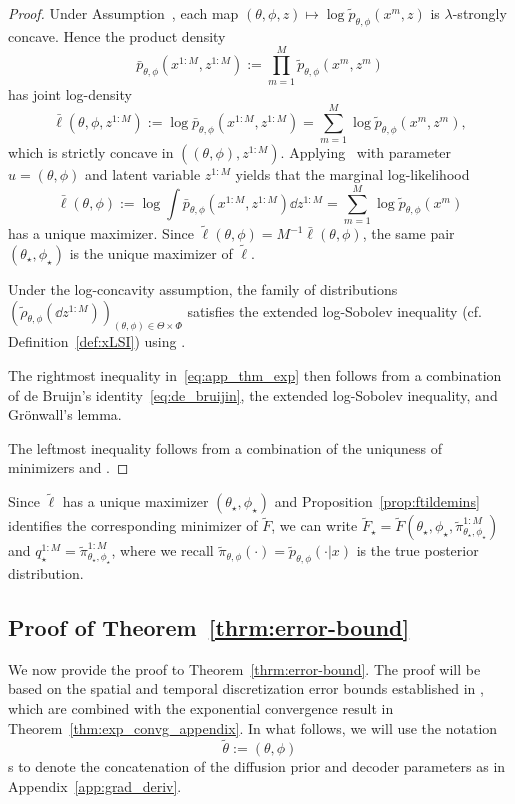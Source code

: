 \begin{proof}

Under Assumption~, each map $(\theta,\phi,z)\mapsto \log \tilde{p}_{\theta,\phi}(x^m,z)$ is $\lambda$-strongly concave. Hence the product density
$$\bar{p}_{\theta,\phi}(x^{1:M},z^{1:M}):=\prod_{m=1}^M\tilde{p}_{\theta,\phi}(x^m,z^m)$$
has joint log-density
$$\bar{\ell}(\theta,\phi,z^{1:M}):=\log \bar{p}_{\theta,\phi}(x^{1:M},z^{1:M})=\sum_{m=1}^M\log\tilde{p}_{\theta,\phi}(x^m,z^m),$$
which is strictly concave in $((\theta,\phi),z^{1:M})$. Applying~\citet[Theorem 4]{kuntz23a} with parameter $u=(\theta,\phi)$ and latent variable $z^{1:M}$ yields that the marginal log-likelihood
$$\bar{\ell}(\theta,\phi):=\log \int \bar{p}_{\theta,\phi}(x^{1:M},z^{1:M}) \dd z^{1:M}=\sum_{m=1}^M\log\tilde{p}_{\theta,\phi}(x^m)$$
has a unique maximizer. Since $\tilde{\ell}(\theta,\phi)=M^{-1}\bar{\ell}(\theta,\phi)$, the same pair $(\theta_\star,\phi_\star)$ is the unique maximizer of $\tilde{\ell}$.

Under the log-concavity assumption, the family of distributions $(\tilde{\rho}_{\theta,\phi}(\dd z^{1:M}))_{(\theta,\phi)\in\Theta\times\Phi}$ satisfies the extended log-Sobolev inequality (cf. Definition~\ref{def:xLSI}) using .

The rightmost inequality in~\eqref{eq:app_thm_exp} then follows from a combination of de Bruijn's identity~\eqref{eq:de_bruijin}, the extended log-Sobolev inequality, and Gr\"onwall's lemma. 

The leftmost inequality follows from a combination of the uniquness of minimizers and . 
\end{proof}
\begin{remark}\label{remark:star_notation}
    Since $\tilde{\ell}$ has a unique maximizer $(\theta_\star,\phi_\star)$ and Proposition~\ref{prop:ftildemins} identifies the corresponding minimizer of $\tilde{F}$, we can write $\tilde{F}_\star =\tilde{F}(\theta_\star,\phi_\star,\tilde\pi_{\theta_\star,\phi_\star}^{1:M})$ and $q_\star^{1:M}=\tilde\pi_{\theta_\star,\phi_\star}^{1:M}$, where we recall $\tilde\pi_{\theta,\phi}(\cdot)=\tilde{p}_{\theta,\phi}(\cdot|x)$ is the true posterior distribution.
\end{remark}


\subsection{Proof of Theorem~\ref{thrm:error-bound}}\label{sec_app:discretize_proof}
We now provide the proof to Theorem~\ref{thrm:error-bound}. The proof will be based on the spatial and temporal discretization error bounds established in \citet{caprioerrorboundsparticle2024}, which are combined with the exponential convergence result in Theorem~\ref{thm:exp_convg_appendix}. In what follows, we will use the notation \[\tilde\theta:=(\theta, \phi)\]s
to denote the concatenation of the diffusion prior and decoder parameters as in Appendix~\ref{app:grad_deriv}.


